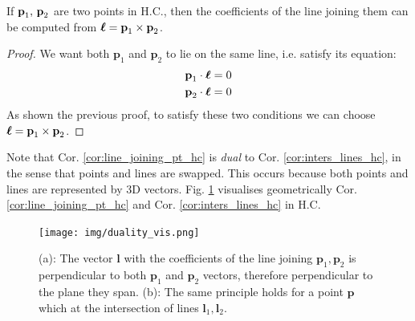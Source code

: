 \documentclass[a4paper]{article}
\begin{document}
\begin{corollary}
If $\textbf{\textup{p}}_1, \, \textbf{\textup{p}}_2$ are two points in H.C., then the coefficients of the line joining them can be computed from $\boldsymbol{\ell} = \textbf{\textup{p}}_1 \times \textbf{\textup{p}}_2$.
\label{cor:line_joining_pt_hc}
\end{corollary}
\begin{proof}
We want both $\textbf{p}_1$ and $\textbf{p}_2$ to lie on the same line, i.e. satisfy its equation:
\begin{align*}
    \textbf{p}_1 \cdot \boldsymbol{\ell} = 0\\
    \textbf{p}_2 \cdot \boldsymbol{\ell} = 0
\end{align*}
As shown the previous proof, to satisfy these two conditions we can choose $\boldsymbol{\ell} = \textbf{p}_1\times \textbf{p}_2$.
\end{proof}
Note that Cor. \ref{cor:line_joining_pt_hc} is \textit{dual} to Cor. \ref{cor:inters_lines_hc}, in the sense that points and lines are swapped. This occurs because both points and lines are represented by 3D vectors. Fig. \ref{fig:duality_vis} visualises geometrically Cor. \ref{cor:line_joining_pt_hc} and Cor. \ref{cor:inters_lines_hc} in H.C.

\begin{figure}[H]
    \centering
    \texttt{[image: img/duality\_vis.png]}
    \caption{(a): The vector $\textbf{l}$ with the coefficients of the line joining $\textbf{p}_1, \textbf{p}_2$ is perpendicular to both $\textbf{p}_1$ and $\textbf{p}_2$ vectors, therefore perpendicular to the plane they span. (b): The same principle holds for a point $\textbf{p}$ which at the intersection of lines $\textbf{l}_1, \textbf{l}_2$.}
    \label{fig:duality_vis}
\end{figure}
\end{document}
